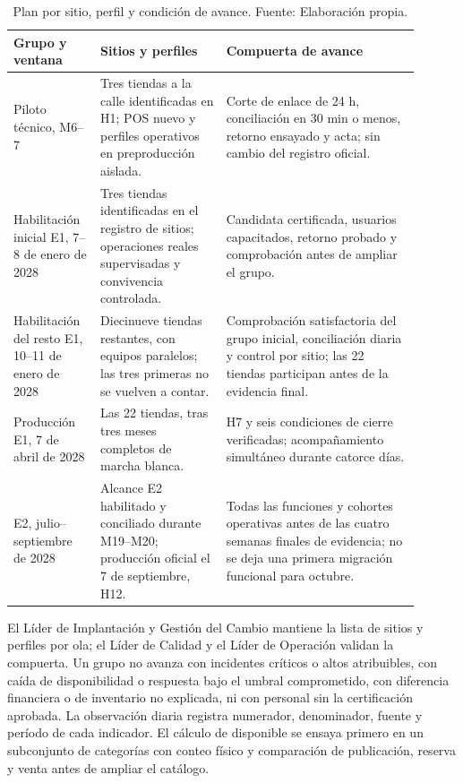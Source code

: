 \documentclass[11pt]{article}
\begin{document}
\begin{longtable}{@{}p{0.18\linewidth}p{0.29\linewidth}p{0.43\linewidth}@{}}
\caption[Plan por sitio, perfil y condición de avance]{Plan por sitio, perfil y condición de avance. Fuente: Elaboración propia.}\label{tab:t18-1}\\
\toprule
\textbf{Grupo y ventana} & \textbf{Sitios y perfiles} & \textbf{Compuerta de avance} \\
\midrule
\endhead
\bottomrule
\endlastfoot
Piloto técnico, M6--7 & Tres tiendas a la calle identificadas en H1; POS nuevo y perfiles operativos en preproducción aislada. & Corte de enlace de 24 h, conciliación en 30 min o menos, retorno ensayado y acta; sin cambio del registro oficial. \\
Habilitación inicial E1, 7--8 de enero de 2028 & Tres tiendas identificadas en el registro de sitios; operaciones reales supervisadas y convivencia controlada. & Candidata certificada, usuarios capacitados, retorno probado y comprobación antes de ampliar el grupo. \\
Habilitación del resto E1, 10--11 de enero de 2028 & Diecinueve tiendas restantes, con equipos paralelos; las tres primeras no se vuelven a contar. & Comprobación satisfactoria del grupo inicial, conciliación diaria y control por sitio; las 22 tiendas participan antes de la evidencia final. \\
Producción E1, 7 de abril de 2028 & Las 22 tiendas, tras tres meses completos de marcha blanca. & H7 y seis condiciones de cierre verificadas; acompañamiento simultáneo durante catorce días. \\
E2, julio--septiembre de 2028 & Alcance E2 habilitado y conciliado durante M19--M20; producción oficial el 7 de septiembre, H12. & Todas las funciones y cohortes operativas antes de las cuatro semanas finales de evidencia; no se deja una primera migración funcional para octubre. \\
\end{longtable}

El Líder de Implantación y Gestión del Cambio mantiene la lista de sitios y perfiles por ola; el Líder de Calidad y el Líder de Operación validan la compuerta. Un grupo no avanza con incidentes críticos o altos atribuibles, con caída de disponibilidad o respuesta bajo el umbral comprometido, con diferencia financiera o de inventario no explicada, ni con personal sin la certificación aprobada. La observación diaria registra numerador, denominador, fuente y período de cada indicador. El cálculo de disponible se ensaya primero en un subconjunto de categorías con conteo físico y comparación de publicación, reserva y venta antes de ampliar el catálogo.
\end{document}
